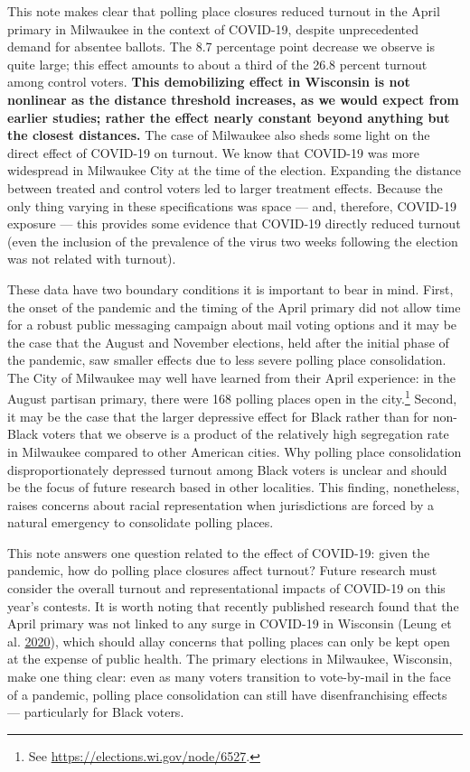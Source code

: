 \documentclass[
  12pt,
]{article}
\begin{document}
This note makes clear that polling place closures reduced turnout in the April primary in Milwaukee in the context of COVID-19, despite unprecedented demand for absentee ballots. The 8.7 percentage point decrease we observe is quite large; this effect amounts to about a third of the 26.8 percent turnout among control voters. \textbf{This demobilizing effect in Wisconsin is not nonlinear as the distance threshold increases, as we would expect from earlier studies; rather the effect nearly constant beyond anything but the closest distances.} The case of Milwaukee also sheds some light on the direct effect of COVID-19 on turnout. We know that COVID-19 was more widespread in Milwaukee City at the time of the election. Expanding the distance between treated and control voters led to larger treatment effects. Because the only thing varying in these specifications was space --- and, therefore, COVID-19 exposure --- this provides some evidence that COVID-19 directly reduced turnout (even the inclusion of the prevalence of the virus two weeks following the election was not related with turnout).

These data have two boundary conditions it is important to bear in mind. First, the onset of the pandemic and the timing of the April primary did not allow time for a robust public messaging campaign about mail voting options and it may be the case that the August and November elections, held after the initial phase of the pandemic, saw smaller effects due to less severe polling place consolidation. The City of Milwaukee may well have learned from their April experience: in the August partisan primary, there were 168 polling places open in the city.\footnote{See \url{https://elections.wi.gov/node/6527}.} Second, it may be the case that the larger depressive effect for Black rather than for non-Black voters that we observe is a product of the relatively high segregation rate in Milwaukee compared to other American cities. Why polling place consolidation disproportionately depressed turnout among Black voters is unclear and should be the focus of future research based in other localities. This finding, nonetheless, raises concerns about racial representation when jurisdictions are forced by a natural emergency to consolidate polling places.

This note answers one question related to the effect of COVID-19: given the pandemic, how do polling place closures affect turnout? Future research must consider the overall turnout and representational impacts of COVID-19 on this year's contests. It is worth noting that recently published research found that the April primary was not linked to any surge in COVID-19 in Wisconsin (Leung et al. \protect\hyperlink{ref-Leung2020}{2020}), which should allay concerns that polling places can only be kept open at the expense of public health. The primary elections in Milwaukee, Wisconsin, make one thing clear: even as many voters transition to vote-by-mail in the face of a pandemic, polling place consolidation can still have disenfranchising effects --- particularly for Black voters.
\end{document}
